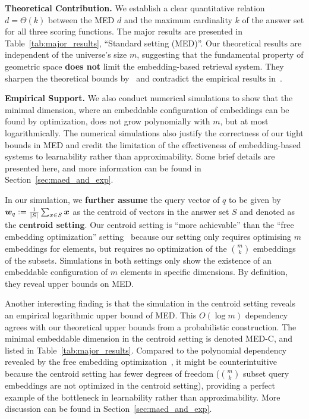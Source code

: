 \documentclass[10pt]{article}
\begin{document}
\textbf{Theoretical Contribution.} We establish a clear quantitative relation $d = \Theta(k)$ between the MED $d$ and the maximum cardinality $k$ of the answer set for all three scoring functions. The major results are presented in Table~\ref{tab:major_results}, ``Standard setting (MED)''. Our theoretical results are independent of the universe's size $m$, suggesting that the fundamental property of geometric space \textbf{does not} limit the embedding-based retrieval system. They sharpen the theoretical bounds by~\cite{weller2025theoretical} and contradict the empirical results in~\cite{weller2025theoretical}.

\textbf{Empirical Support.} We also conduct numerical simulations to show that the minimal dimension, where an embeddable configuration of embeddings can be found by optimization, does not grow polynomially with $m$, but at most logarithmically. The numerical simulations also justify the correctness of our tight bounds in MED and credit the limitation of the effectiveness of embedding-based systems to learnability rather than approximability. Some brief details are presented here, and more information can be found in Section~\ref{sec:maed_and_exp}.



In our simulation, we \textbf{further assume} the query vector of $q$ to be given by $\bm{w}_q:= \frac{1}{|S|}\sum_{x\in S} \bm{x}$ as the centroid of vectors in the answer set $S$ and denoted as the \textbf{centroid setting}. Our centroid setting is ``more achievable'' than the ``free embedding optimization'' setting~\cite{weller2025theoretical} because our setting only requires optimising $m$ embeddings for elements, but requires no optimization of the $\binom{m}{k}$ embeddings of the subsets. Simulations in both settings only show the existence of an embeddable configuration of $m$ elements in specific dimensions. By definition, they reveal upper bounds on MED. 

Another interesting finding is that the simulation in the centroid setting reveals an empirical logarithmic upper bound of MED. This $O(\log m)$ dependency agrees with our theoretical upper bounds from a probabilistic construction. The minimal embeddable dimension in the centroid setting is denoted MED-C, and listed in Table~\ref{tab:major_results}. Compared to the polynomial dependency revealed by the free embedding optimization~\cite{weller2025theoretical}, it might be counterintuitive because the centroid setting has fewer degrees of freedom ($\binom{m}{k}$ subset query embeddings are not optimized in the centroid setting), providing a perfect example of the bottleneck in learnability rather than approximability. More discussion can be found in Section~\ref{sec:maed_and_exp}.
\end{document}
